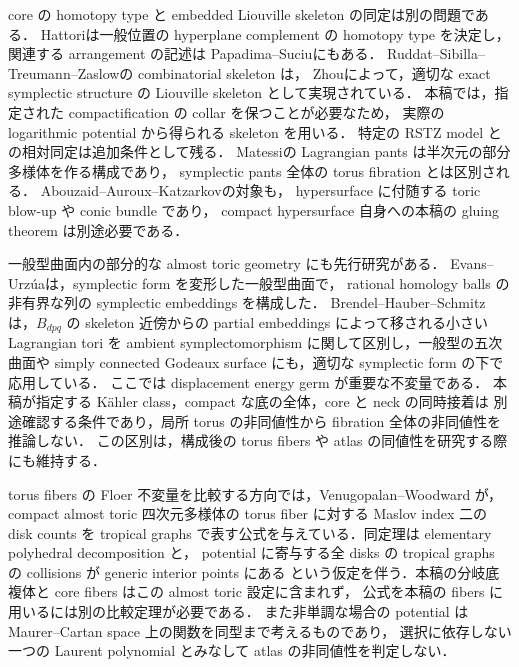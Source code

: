 core の homotopy type と embedded Liouville skeleton の同定は別の問題である．
Hattori\cite{Hattori}は一般位置の hyperplane complement の homotopy type を決定し，
関連する arrangement の記述は Papadima--Suciu\cite[\S1.1]{PapadimaSuciu}にもある．
Ruddat--Sibilla--Treumann--Zaslow\cite{RSTZ}の combinatorial skeleton は，
Zhou\cite{Zhou}によって，適切な exact symplectic structure の
Liouville skeleton として実現されている．
本稿では，指定された compactification の collar を保つことが必要なため，
実際の logarithmic potential から得られる skeleton を用いる．
特定の RSTZ model との相対同定は追加条件として残る．
Matessi\cite{MatessiPants,Matessi}の Lagrangian pants は半次元の部分多様体を作る構成であり，
symplectic pants 全体の torus fibration とは区別される．
Abouzaid--Auroux--Katzarkov\cite{AAK}の対象も，
hypersurface に付随する toric blow-up や conic bundle であり，
compact hypersurface 自身への本稿の gluing theorem は別途必要である．

一般型曲面内の部分的な almost toric geometry にも先行研究がある．
Evans--Urz\'ua\cite{EvansUrzua}は，symplectic form を変形した一般型曲面で，
rational homology balls の非有界な列の symplectic embeddings を構成した．
Brendel--Hauber--Schmitz\cite{BHS}は，$B_{dpq}$ の skeleton 近傍からの
partial embeddings によって移される小さい Lagrangian tori を
ambient symplectomorphism に関して区別し，一般型の五次曲面や
simply connected Godeaux surface にも，適切な symplectic form の下で応用している．
ここでは displacement energy germ が重要な不変量である．
本稿が指定する K\"ahler class，compact な底の全体，core と neck の同時接着は
別途確認する条件であり，局所 torus の非同値性から fibration 全体の非同値性を推論しない．
この区別は，構成後の torus fibers や atlas の同値性を研究する際にも維持する．

torus fibers の Floer 不変量を比較する方向では，Venugopalan--Woodward
\cite[Definitions~1.1--1.2, Theorem~1.3]{VenugopalanWoodward2026}が，
compact almost toric 四次元多様体の torus fiber に対する Maslov index 二の disk counts を
tropical graphs で表す公式を与えている．同定理は elementary polyhedral decomposition と，
potential に寄与する全 disks の tropical graphs の collisions が generic interior points にある
という仮定を伴う．本稿の分岐底複体と core fibers はこの almost toric 設定に含まれず，
公式を本稿の fibers に用いるには別の比較定理が必要である．
また非単調な場合の potential は Maurer--Cartan space 上の関数を同型まで考えるものであり，
選択に依存しない一つの Laurent polynomial とみなして atlas の非同値性を判定しない．

